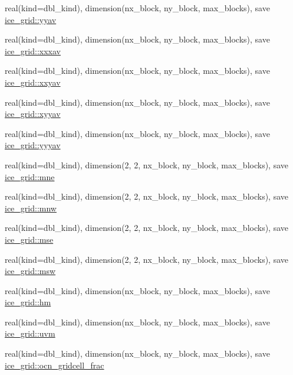 \begin{DoxyCompactItemize}
\item 
real(kind=dbl\_\-kind), dimension(nx\_\-block, ny\_\-block, max\_\-blocks), save \hyperlink{namespaceice__grid_ae982b98ad7bfa759bb9a1da9dd749783}{ice\_\-grid::yyav}
\item 
real(kind=dbl\_\-kind), dimension(nx\_\-block, ny\_\-block, max\_\-blocks), save \hyperlink{namespaceice__grid_a62131a38b595f37c91ebbec351691ef3}{ice\_\-grid::xxxav}
\item 
real(kind=dbl\_\-kind), dimension(nx\_\-block, ny\_\-block, max\_\-blocks), save \hyperlink{namespaceice__grid_a471e3cdf6d11b7f3831afcdfb354fbfc}{ice\_\-grid::xxyav}
\item 
real(kind=dbl\_\-kind), dimension(nx\_\-block, ny\_\-block, max\_\-blocks), save \hyperlink{namespaceice__grid_ab0c9d28119dfb18bfc26a3f493b2e844}{ice\_\-grid::xyyav}
\item 
real(kind=dbl\_\-kind), dimension(nx\_\-block, ny\_\-block, max\_\-blocks), save \hyperlink{namespaceice__grid_a9ed5ccbe07d1272b819d05221f756b06}{ice\_\-grid::yyyav}
\item 
real(kind=dbl\_\-kind), dimension(2, 2, nx\_\-block, ny\_\-block, max\_\-blocks), save \hyperlink{namespaceice__grid_ac0cdb9f8f4e8be0dcf32a5e7adb1ac53}{ice\_\-grid::mne}
\item 
real(kind=dbl\_\-kind), dimension(2, 2, nx\_\-block, ny\_\-block, max\_\-blocks), save \hyperlink{namespaceice__grid_a9d5b1bf4f3c68140602c96bf28865733}{ice\_\-grid::mnw}
\item 
real(kind=dbl\_\-kind), dimension(2, 2, nx\_\-block, ny\_\-block, max\_\-blocks), save \hyperlink{namespaceice__grid_a63866b0446065c97c825f70fc29a3654}{ice\_\-grid::mse}
\item 
real(kind=dbl\_\-kind), dimension(2, 2, nx\_\-block, ny\_\-block, max\_\-blocks), save \hyperlink{namespaceice__grid_a517a26693b149509ae9e4a6c2f310dda}{ice\_\-grid::msw}
\item 
real(kind=dbl\_\-kind), dimension(nx\_\-block, ny\_\-block, max\_\-blocks), save \hyperlink{namespaceice__grid_a7ecb27b1b130ed860c56ab81f4a9373e}{ice\_\-grid::hm}
\item 
real(kind=dbl\_\-kind), dimension(nx\_\-block, ny\_\-block, max\_\-blocks), save \hyperlink{namespaceice__grid_aa8b13eb710c7be4a90e210294e37b5af}{ice\_\-grid::uvm}
\item 
real(kind=dbl\_\-kind), dimension(nx\_\-block, ny\_\-block, max\_\-blocks), save \hyperlink{namespaceice__grid_a5241715733bdedb6dc95cff6f23292de}{ice\_\-grid::ocn\_\-gridcell\_\-frac}
\item 

\end{DoxyCompactItemize}
